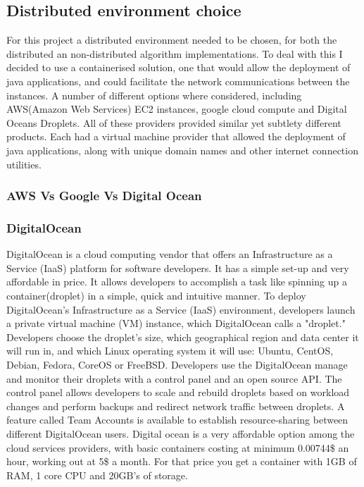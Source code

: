 \documentclass[oneside,12pt]{book}
\begin{document}
\subsection{Distributed environment choice}
For this project a distributed environment needed to be chosen, for both the distributed an non-distributed algorithm implementations. To deal with this I decided to use a containerised solution, one that would allow the deployment of java applications, and could facilitate the network communications between the instances. A number of different options where considered, including AWS(Amazon Web Services) EC2 instances, google cloud compute and Digital Oceans Droplets. All of these providers provided similar yet subtlety different products. Each had a virtual machine provider that allowed the deployment of java applications, along with unique domain names and other internet connection utilities. 
\subsubsection{AWS Vs Google Vs Digital Ocean}

\subsubsection{DigitalOcean}
DigitalOcean is a cloud computing vendor that offers an Infrastructure as a Service (IaaS) platform for software developers. It has a simple set-up and very affordable in price. It allows developers to accomplish a task like spinning up a container(droplet) in a simple, quick and intuitive manner. To deploy DigitalOcean's Infrastructure as a Service (IaaS) environment, developers launch a private virtual machine (VM) instance, which DigitalOcean calls a "droplet." Developers choose the droplet's size, which geographical region and data center it will run in, and which Linux operating system it will use: Ubuntu, CentOS, Debian, Fedora, CoreOS or FreeBSD. 
Developers use the DigitalOcean manage and monitor their droplets with a control panel and an open source API. The control panel allows developers to scale and rebuild droplets based on workload changes and perform backups and redirect network traffic between droplets. A feature called Team Accounts is available to establish resource-sharing between different DigitalOcean users.
Digital ocean is a very affordable option among the cloud services providers, with basic containers costing at minimum 0.00744\$ an hour, working out at 5\$ a month. For that price you get a container with 1GB of RAM, 1 core CPU and 20GB's of storage.  
\end{document}
